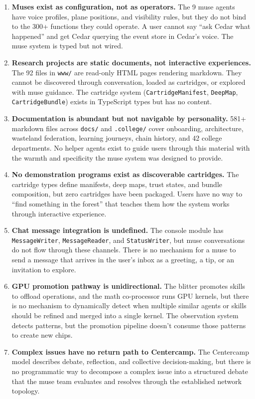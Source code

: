 \documentclass[11pt,letterpaper]{article}
\begin{document}
\begin{enumerate}[leftmargin=2em]
\item \textbf{Muses exist as configuration, not as operators.} The 9 muse agents have voice profiles, plane positions, and visibility rules, but they do not bind to the 300+ functions they could operate. A user cannot say ``ask Cedar what happened'' and get Cedar querying the event store in Cedar's voice. The muse system is typed but not wired.

\item \textbf{Research projects are static documents, not interactive experiences.} The 92 files in \texttt{www/} are read-only HTML pages rendering markdown. They cannot be discovered through conversation, loaded as cartridges, or explored with muse guidance. The cartridge system (\texttt{CartridgeManifest}, \texttt{DeepMap}, \texttt{CartridgeBundle}) exists in TypeScript types but has no content.

\item \textbf{Documentation is abundant but not navigable by personality.} 581+ markdown files across \texttt{docs/} and \texttt{.college/} cover onboarding, architecture, wasteland federation, learning journeys, chain history, and 42 college departments. No helper agents exist to guide users through this material with the warmth and specificity the muse system was designed to provide.

\item \textbf{No demonstration programs exist as discoverable cartridges.} The cartridge types define manifests, deep maps, trust states, and bundle composition, but zero cartridges have been packaged. Users have no way to ``find something in the forest'' that teaches them how the system works through interactive experience.

\item \textbf{Chat message integration is undefined.} The console module has \texttt{MessageWriter}, \texttt{MessageReader}, and \texttt{StatusWriter}, but muse conversations do not flow through these channels. There is no mechanism for a muse to send a message that arrives in the user's inbox as a greeting, a tip, or an invitation to explore.

\item \textbf{GPU promotion pathway is unidirectional.} The blitter promotes skills to offload operations, and the math co-processor runs GPU kernels, but there is no mechanism to dynamically detect when multiple similar agents or skills should be refined and merged into a single kernel. The observation system detects patterns, but the promotion pipeline doesn't consume those patterns to create new chips.

\item \textbf{Complex issues have no return path to Centercamp.} The Centercamp model describes debate, reflection, and collective decision-making, but there is no programmatic way to decompose a complex issue into a structured debate that the muse team evaluates and resolves through the established network topology.
\end{enumerate}
\end{document}
